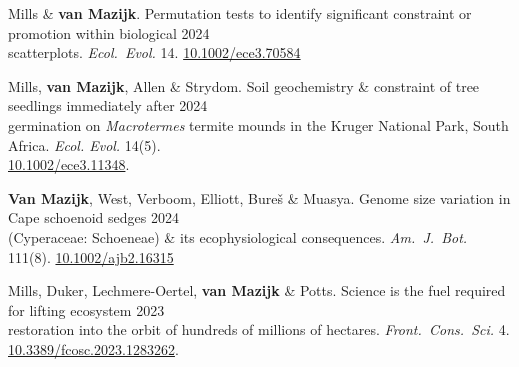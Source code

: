 

Mills \& \textbf{van Mazijk}.
Permutation tests to identify significant constraint or promotion within biological \hfill 2024 \\
\hspace{2em} scatterplots.
  \textit{Ecol.~Evol.}
  14. \href{http://dx.doi.org/10.1002/ece3.70584}{10.1002/ece3.70584}

Mills, \textbf{van Mazijk}, Allen \& Strydom.
Soil geochemistry \& constraint of tree seedlings immediately after
                                                              \hfill 2024 \\
\hspace{2em} germination on \textit{Macrotermes} termite
  mounds in the Kruger National Park, South Africa.
  \textit{Ecol. Evol.} 14(5). \\
  \hspace{2em} \href{http://dx.doi.org/10.1002/ece3.11348}{10.1002/ece3.11348}.

\textbf{Van Mazijk}, West, Verboom, Elliott, Bureš \& Muasya.
Genome size variation in Cape schoenoid sedges                \hfill 2024 \\
\hspace{2em} (Cyperaceae: Schoeneae) \& its ecophysiological consequences.
  \textit{Am.~J.~Bot.}
  111(8).
  \href{http://dx.doi.org/10.1002/ajb2.16315}{10.1002/ajb2.16315}

Mills, Duker, Lechmere-Oertel, \textbf{van Mazijk} \& Potts.
Science is the fuel required for lifting ecosystem             \hfill 2023 \\
\hspace{2em} restoration into the orbit of hundreds of millions of hectares.
  \textit{Front.~Cons.~Sci.}
  4. \\
  \hspace{2em} \href{https://doi.org/10.3389/fcosc.2023.1283262}{10.3389/fcosc.2023.1283262}.

